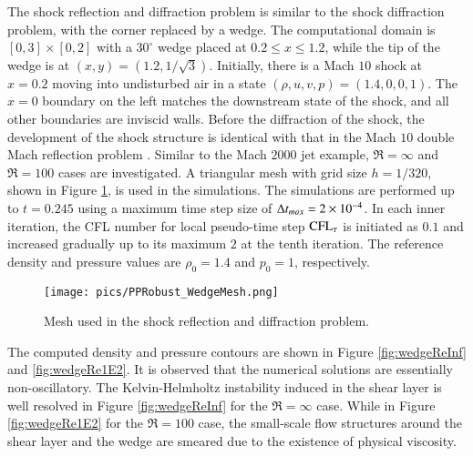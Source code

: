 The shock reflection and diffraction problem \cite{zhang2017positivity} is similar to the shock diffraction problem,
with the corner replaced by a wedge. The computational domain is $[0,3]\times[0,2]$
with a $30^\circ$ wedge placed at $0.2 \leq x \leq 1.2$, while the
tip of the wedge is at $(x,y) = (1.2, 1/\sqrt{3})$.
Initially, there is a Mach $10$ shock at $x=0.2$ moving into undisturbed air in a state $(\rho, u, v, p) = (1.4,0,0,1)$. The $x=0$ boundary on
the left matches the downstream state of the shock, and all other boundaries
are inviscid walls.
Before the diffraction of the shock, the development
of the shock structure is identical with that in the Mach $10$ double Mach reflection problem \cite{woodward1984dmr}.
Similar to the Mach $2000$ jet example, $\Re=\infty$ and $\Re=100$ cases
are investigated.
A triangular mesh with grid size $h = 1/320$,
shown in Figure \ref{fig:wedgeMesh}, is used in the simulations.
The simulations are performed up to $t=0.245$ using
a maximum time step size of $\mathrm\Delta t_{max}= 2\times10^{-4}$.
In each inner iteration, the CFL number for local pseudo-time step $\text{CFL}_\tau$ is initiated as $0.1$
and increased gradually up to its maximum $2$ at the tenth iteration.
The reference density and pressure values are $\rho_0=1.4$ and $p_0=1$, respectively.

\begin{figure}[htbp]
    \centering
    \texttt{[image: pics/PPRobust\_WedgeMesh.png]}
    \caption{Mesh used in the shock reflection and diffraction problem.}
    \label{fig:wedgeMesh}
\end{figure}

The computed density and pressure contours are shown in Figure \ref{fig:wedgeReInf} and \ref{fig:wedgeRe1E2}.
It is observed that the numerical solutions are essentially non-oscillatory.
The Kelvin-Helmholtz instability induced in the shear layer is well resolved in Figure \ref{fig:wedgeReInf} for the $\Re=\infty$ case.
While in Figure  \ref{fig:wedgeRe1E2} for the $\Re=100$ case,
the small-scale flow structures around the shear layer and the wedge are smeared  due to the existence of physical viscosity.

